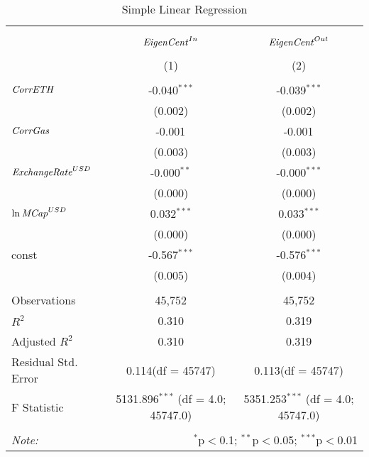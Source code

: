 \begin{table}[!htbp] \centering
  \caption{Simple Linear Regression}
\begin{tabular}{@{\extracolsep{5pt}}lcc}
\\[-1.8ex]\hline
\hline \\[-1.8ex]
\\[-1.8ex] & \multicolumn{1}{c}{${\it EigenCent}^{In}$} & \multicolumn{1}{c}{${\it EigenCent}^{Out}$}  \\
\\[-1.8ex] & (1) & (2) \\
\hline \\[-1.8ex]
 ${\it CorrETH}$ & -0.040$^{***}$ & -0.039$^{***}$ \\
  & (0.002) & (0.002) \\
 ${\it CorrGas}$ & -0.001$^{}$ & -0.001$^{}$ \\
  & (0.003) & (0.003) \\
 ${\it ExchangeRate}^{USD}$ & -0.000$^{**}$ & -0.000$^{***}$ \\
  & (0.000) & (0.000) \\
 ${\it \ln MCap}^{USD}$ & 0.032$^{***}$ & 0.033$^{***}$ \\
  & (0.000) & (0.000) \\
 const & -0.567$^{***}$ & -0.576$^{***}$ \\
  & (0.005) & (0.004) \\
\hline \\[-1.8ex]
 Observations & 45,752 & 45,752 \\
 $R^2$ & 0.310 & 0.319 \\
 Adjusted $R^2$ & 0.310 & 0.319 \\
 Residual Std. Error & 0.114(df = 45747) & 0.113(df = 45747)  \\
 F Statistic & 5131.896$^{***}$ (df = 4.0; 45747.0) & 5351.253$^{***}$ (df = 4.0; 45747.0) \\
\hline
\hline \\[-1.8ex]
\textit{Note:} & \multicolumn{2}{r}{$^{*}$p$<$0.1; $^{**}$p$<$0.05; $^{***}$p$<$0.01} \\
\end{tabular}
\end{table}